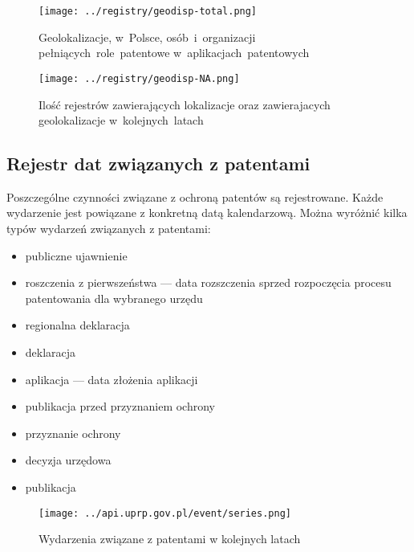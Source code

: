 \begin{figure}[H]\centering
\texttt{[image: ../registry/geodisp-total.png]}
\caption{Geolokalizacje,
         w~Polsce,
         osób~i~organizacji 
         pełniących~role~patentowe 
         w~aplikacjach~patentowych}
\label{fig:geodisp.png}
\end{figure}

\begin{figure}[H]\centering
\texttt{[image: ../registry/geodisp-NA.png]}
\caption{Ilość rejestrów  
         zawierających lokalizacje oraz
         zawierajacych geolokalizacje
         w~kolejnych~latach}
\label{fig:geodisp.png}
\end{figure}



\subsection{Rejestr dat związanych z patentami}

Poszczególne czynności związane z ochroną patentów są rejestrowane.
Każde wydarzenie jest powiązane z konkretną datą kalendarzową.
Można wyróżnić kilka typów wydarzeń związanych z patentami:

\begin{itemize}
\item publiczne ujawnienie 
\item roszczenia z pierwszeństwa  --- 
      data rozszczenia sprzed rozpoczęcia procesu patentowania dla wybranego urzędu
\item regionalna deklaracja 
\item deklaracja 
\item aplikacja  --- data złożenia aplikacji
\item publikacja przed przyznaniem ochrony 
\item przyznanie ochrony 
\item decyzja urzędowa
\item publikacja
\end{itemize}

\begin{figure}[H]\centering
\texttt{[image: ../api.uprp.gov.pl/event/series.png]}
\caption{Wydarzenia związane z patentami w kolejnych latach}
\label{fig:geodisp.png}
\end{figure}

